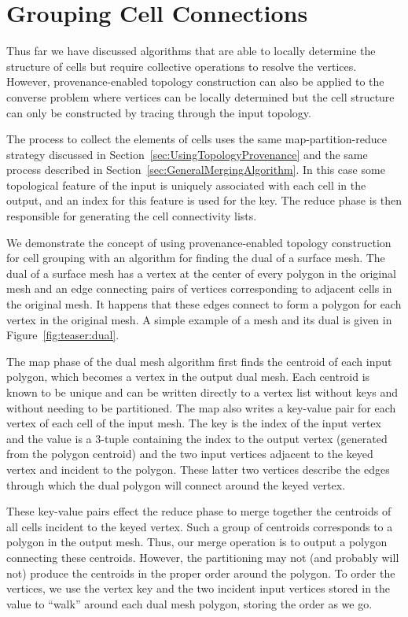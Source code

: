 \documentclass[10pt,journal,cspaper,compsoc]{IEEEtran}
\begin{document}
\section{Grouping Cell Connections}
\label{sec:GroupingCellConnections}

Thus far we have discussed algorithms that are able to locally determine
the structure of cells but require collective operations to resolve the
vertices.  However, provenance-enabled topology construction can also be
applied to the converse problem where vertices can be locally determined
but the cell structure can only be constructed by tracing through the input
topology.

The process to collect the elements of cells uses the same
map-partition-reduce strategy discussed in
Section~\ref{sec:UsingTopologyProvenance} and the same 
process described in Section~\ref{sec:GeneralMergingAlgorithm}.  In this
case some topological feature of the input is uniquely associated with each
cell in the output, and an index for this feature is used for the key.  The
reduce phase is then responsible for generating the cell connectivity
lists.

We demonstrate the concept of using provenance-enabled topology
construction for cell grouping with an algorithm for finding the dual of a
surface mesh.  The dual of a surface mesh has a vertex at the center of
every polygon in the original mesh and an edge connecting pairs of vertices
corresponding to adjacent cells in the original mesh.  It happens that
these edges connect to form a polygon for each vertex in the original mesh.
A simple example of a mesh and its dual is given in
Figure~\ref{fig:teaser:dual}.

The map phase of the dual mesh algorithm first finds the centroid of each
input polygon, which becomes a vertex in the output dual mesh.  Each
centroid is known to be unique and can be written directly to a vertex list
without keys and without needing to be partitioned.  The map also writes a
key-value pair for each vertex of each cell of the input mesh.  The key is
the index of the input vertex and the value is a 3-tuple containing the
index to the output vertex (generated from the polygon centroid) and the
two input vertices adjacent to the keyed vertex and incident to the
polygon.  These latter two vertices describe the edges through which the
dual polygon will connect around the keyed vertex.

These key-value pairs effect the reduce phase to merge together the
centroids of all cells incident to the keyed vertex.  Such a group of
centroids corresponds to a polygon in the output mesh.  Thus, our merge
operation is to output a polygon connecting these centroids.  However, the
partitioning may not (and probably will not) produce the centroids in the
proper order around the polygon.  To order the vertices, we use the vertex
key and the two incident input vertices stored in the value to ``walk''
around each dual mesh polygon, storing the order as we go.
\end{document}
